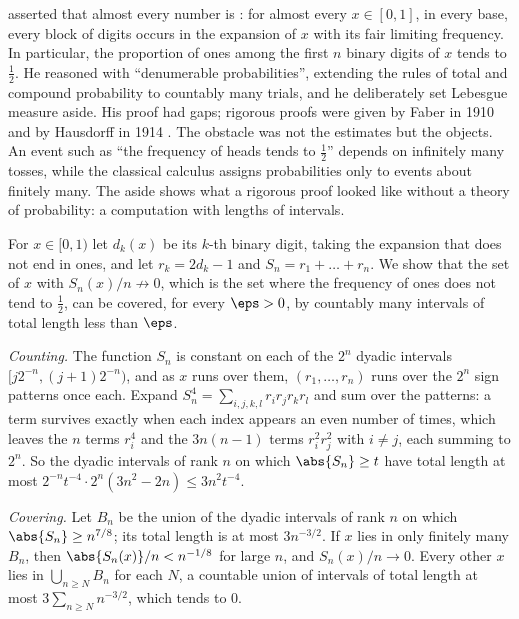 \begin{refsection}
\textcite{Borel1909} asserted that almost every number is : for almost every $x\in[0,1]$, in every base, every block of digits occurs in the expansion of $x$ with its fair limiting frequency. In particular, the proportion of ones among the first $n$ binary digits of $x$ tends to $\frac12$. He reasoned with ``denumerable probabilities'', extending the rules of total and compound probability to countably many trials, and he deliberately set Lebesgue measure aside. His proof had gaps; rigorous proofs were given by Faber in 1910 and by Hausdorff in 1914 \parencite{ShaferVovk2006}. The obstacle was not the estimates but the objects. An event such as ``the frequency of heads tends to $\frac12$'' depends on infinitely many tosses, while the classical calculus assigns probabilities only to events about finitely many. The aside shows what a rigorous proof looked like without a theory of probability: a computation with lengths of intervals.

\begin{aside}
For $x\in[0,1)$ let $d_k(x)$ be its $k$-th binary digit, taking the expansion that does not end in ones, and let $r_k=2d_k-1$ and $S_n=r_1+\dots+r_n$. We show that the set of $x$ with $S_n(x)/n\not\to0$, which is the set where the frequency of ones does not tend to $\frac12$, can be covered, for every $\eps>0$, by countably many intervals of total length less than $\eps$.

\emph{Counting.} The function $S_n$ is constant on each of the $2^n$ dyadic intervals $[j2^{-n},(j+1)2^{-n})$, and as $x$ runs over them, $(r_1,\dots,r_n)$ runs over the $2^n$ sign patterns once each. Expand $S_n^4=\sum_{i,j,k,l}r_ir_jr_kr_l$ and sum over the patterns: a term survives exactly when each index appears an even number of times, which leaves the $n$ terms $r_i^4$ and the $3n(n-1)$ terms $r_i^2r_j^2$ with $i\ne j$, each summing to $2^n$. So the dyadic intervals of rank $n$ on which $\abs{S_n}\ge t$ have total length at most $2^{-n}t^{-4}\cdot2^n(3n^2-2n)\le3n^2t^{-4}$.

\emph{Covering.} Let $B_n$ be the union of the dyadic intervals of rank $n$ on which $\abs{S_n}\ge n^{7/8}$; its total length is at most $3n^{-3/2}$. If $x$ lies in only finitely many $B_n$, then $\abs{S_n(x)}/n<n^{-1/8}$ for large $n$, and $S_n(x)/n\to0$. Every other $x$ lies in $\bigcup_{n\ge N}B_n$ for each $N$, a countable union of intervals of total length at most $3\sum_{n\ge N}n^{-3/2}$, which tends to $0$.


\end{aside}
\end{refsection}
